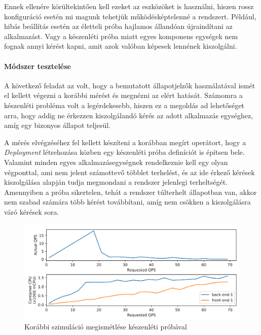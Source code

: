 Ennek ellenére körültekintően kell ezeket az eszközöket is használni, hiszen rossz konfiguráció esetén mi magunk tehetjük működésképtelenné a rendszert.
Például, hibás beállítás esetén az életteli próba hajlamos állandóan újraindítani az alkalmazást. Vagy a készenléti próba miatt egyes komponens egységek nem fognak annyi kérést kapni, amit azok valóban képesek lennének kiszolgálni.

\paragraph{Módszer tesztelése}
A következő feladat az volt, hogy a bemutatott állapotjelzők használatával ismét el kellett végezni a korábbi mérést és megnézni az elért hatását.
Számomra a készenléti probléma volt a legérdekesebb, hiszen ez a megoldás ad lehetőséget arra, hogy addig ne érkezzen kiszolgálandó kérés az adott alkalmazás egységhez, amíg egy bizonyos állapot teljesül.

A mérés elvégzéséhez fel kellett készíteni a korábban megírt operátort, hogy a \textit{Deployment} létrehozása közben egy készenléti próba definíciót is építsen bele. 
Valamint minden egyes alkalmazásegységnek rendelkeznie kell egy olyan végponttal, ami nem jelent számottevő többlet terhelést, és az ide érkező kérések kiszolgálása alapján tudja megmondani a rendszer jelenlegi terheltségét. 
Amennyiben a próba sikertelen, tehát a rendszer túlterhelt állapotban van, akkor nem szabad számára több kérést továbbítani, amíg nem csökken a kiszolgálásra váró kérések sora.

\begin{figure}[!ht]
\centering
\includegraphics[width=150mm, keepaspectratio]{figures/multiFE-singleBE-readinessprobe-sum-regenerate.png}
\caption{Korábbi szimuláció megismétlése készenléti próbával}
\label{fig:readiness-probe-measurement}
\end{figure}

